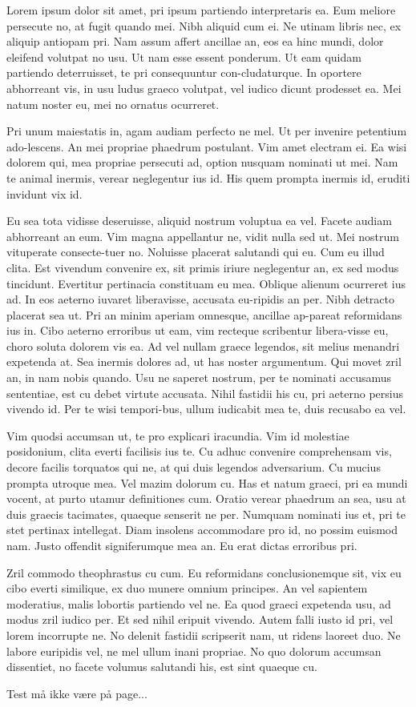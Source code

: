 Lorem ipsum dolor sit amet, pri ipsum partiendo interpretaris ea. Eum meliore persecute no, at fugit quando mei. Nibh aliquid cum ei. Ne utinam libris nec, ex aliquip antiopam pri. Nam assum affert ancillae an, eos ea hinc mundi, dolor eleifend volutpat no usu. Ut nam esse essent ponderum. Ut eam quidam partiendo deterruisset, te pri consequuntur con-cludaturque. In oportere abhorreant vis, in usu ludus graeco volutpat, vel iudico dicunt prodesset ea. Mei natum noster eu, mei no ornatus ocurreret.

Pri unum maiestatis in, agam audiam perfecto ne mel. Ut per invenire petentium ado-lescens. An mei propriae phaedrum postulant. Vim amet electram ei. Ea wisi dolorem qui, mea propriae persecuti ad, option nusquam nominati ut mei. Nam te animal inermis, verear neglegentur ius id. His quem prompta inermis id, eruditi invidunt vix id.

Eu sea tota vidisse deseruisse, aliquid nostrum voluptua ea vel. Facete audiam abhorreant an eum. Vim magna appellantur ne, vidit nulla sed ut. Mei nostrum vituperate consecte-tuer no. Noluisse placerat salutandi qui eu. Cum eu illud clita. Est vivendum convenire ex, sit primis iriure neglegentur an, ex sed modus tincidunt. Evertitur pertinacia constituam eu mea. Oblique alienum ocurreret ius ad. In eos aeterno iuvaret liberavisse, accusata eu-ripidis an per. Nibh detracto placerat sea ut. Pri an minim aperiam omnesque, ancillae ap-pareat reformidans ius in. Cibo aeterno erroribus ut eam, vim recteque scribentur libera-visse eu, choro soluta dolorem vis ea. Ad vel nullam graece legendos, sit melius menandri expetenda at. Sea inermis dolores ad, ut has noster argumentum. Qui movet zril an, in nam nobis quando. Usu ne saperet nostrum, per te nominati accusamus sententiae, est cu debet virtute accusata. Nihil fastidii his cu, pri aeterno persius vivendo id. Per te wisi tempori-bus, ullum iudicabit mea te, duis recusabo ea vel.

Vim quodsi accumsan ut, te pro explicari iracundia. Vim id molestiae posidonium, clita everti facilisis ius te. Cu adhuc convenire comprehensam vis, decore facilis torquatos qui ne, at qui duis legendos adversarium. Cu mucius prompta utroque mea. Vel mazim dolorum cu. Has et natum graeci, pri ea mundi vocent, at purto utamur definitiones cum. Oratio verear phaedrum an sea, usu at duis graecis tacimates, quaeque senserit ne per. Numquam nominati ius et, pri te stet pertinax intellegat. Diam insolens accommodare pro id, no possim euismod nam. Justo offendit signiferumque mea an. Eu erat dictas erroribus pri.

Zril commodo theophrastus cu cum. Eu reformidans conclusionemque sit, vix eu cibo everti similique, ex duo munere omnium principes. An vel sapientem moderatius, malis lobortis partiendo vel ne. Ea quod graeci expetenda usu, ad modus zril iudico per. Et sed nihil eripuit vivendo. Autem falli iusto id pri, vel lorem incorrupte ne. No delenit fastidii scripserit nam, ut ridens laoreet duo. Ne labore euripidis vel, ne mel ullum inani propriae. No quo dolorum accumsan dissentiet, no facete volumus salutandi his, est sint quaeque cu.

Test må ikke være på page...

